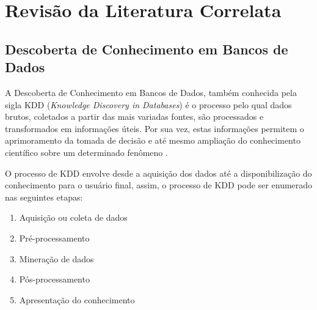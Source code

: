 \section{Revisão da Literatura Correlata} \label{sec:fundamentacao_teorica}

\subsection{Descoberta de Conhecimento em Bancos de Dados} \label{subsec:descoberta_conhecimento_bd}

A Descoberta de Conhecimento em Bancos de Dados, também conhecida pela sigla KDD 
(\emph{Knowledge Discovery in Databases}) é o processo pelo qual dados brutos, coletados a 
partir das mais variadas fontes, são processados e transformados em informações úteis. Por sua vez,
estas informações permitem o aprimoramento da tomada de decisão e até mesmo ampliação do
conhecimento científico sobre um determinado fenômeno \cite{tan2009introducao}.

O processo de KDD envolve desde a aquisição dos dados até a disponibilização do conhecimento
para o usuário final, assim, o processo de KDD pode ser enumerado nas seguintes
etapas:

\begin{enumerate}
    \item Aquisição ou coleta de dados
    \item Pré-processamento
    \item Mineração de dados
    \item Pós-processamento
    \item Apresentação do conhecimento
\end{enumerate}







